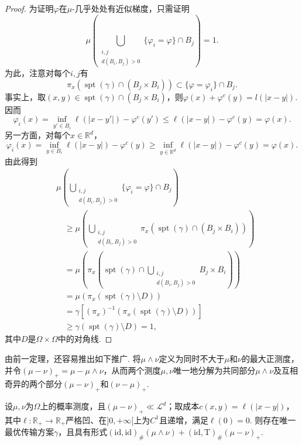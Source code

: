 \begin{proof}
为证明$\varphi$在$\mu$-几乎处处有近似梯度，只需证明
\[
\mu\left(\bigcup_{\substack{i,j\\d(B_i,B_j)>0}}\{\varphi_i=\varphi\}\cap B_j\right)=1.
\]
为此，注意对每个$i,j$有
\[
\pi_x(\operatorname{spt}(\gamma)\cap(B_j\times B_i))\subset\{\varphi=\varphi_i\}\cap B_j.
\]
事实上，取$(x,y)\in\operatorname{spt}(\gamma)\cap(B_j\times B_i)$，则$\varphi(x)+\varphi^c(y)=l(|x-y|)$. 因而
\[
\varphi_i(x)=\inf_{y'\in B_i}\ell(|x-y'|)-\varphi^c(y')
\le\ell(|x-y|)-\varphi^c(y)=\varphi(x).
\]
另一方面，对每个$x\in\mathbb R^d$，
\[
\varphi_i(x)=\inf_{y\in B_i}\ell(|x-y|)-\varphi^c(y)
\ge\inf_{y\in\mathbb R^d}\ell(|x-y|)-\varphi^c(y)=\varphi(x).
\]
由此得到
\begin{equation*}
\begin{aligned}
&\mu\left(\bigcup_{\substack{i,j\\d(B_i,B_j)>0}}\{\varphi_i=\varphi\}\cap B_j\right)\\
&\quad\ge\mu\left(\bigcup_{\substack{i,j\\d(B_i,B_j)>0}}\pi_x(\operatorname{spt}(\gamma)\cap(B_j\times B_i))\right)\\
&\quad=\mu\left(\pi_x\left(\operatorname{spt}(\gamma)\cap\bigcup_{\substack{i,j\\d(B_i,B_j)>0}}B_j\times B_i\right)\right)\\
&\quad=\mu(\pi_x(\operatorname{spt}(\gamma)\setminus D))\\
&\quad=\gamma\left[(\pi_x)^{-1}(\pi_x(\operatorname{spt}(\gamma)\setminus D))\right]\\
&\quad\ge\gamma(\operatorname{spt}(\gamma)\setminus D)=1,
\end{aligned}
\end{equation*}
其中$D$是$\Omega\times\Omega$中的对角线.
\end{proof}

由前一定理，还容易推出如下推广. 将$\mu\wedge\nu$定义为同时不大于$\mu$和$\nu$的最大正测度，并令$(\mu-\nu)_+=\mu-\mu\wedge\nu$，从而两个测度$\mu,\nu$唯一地分解为共同部分$\mu\wedge\nu$及互相奇异的两个部分$(\mu-\nu)_+$和$(\nu-\mu)_+$.

\begin{theorem}\label{obj:3.27}
设$\mu,\nu$为$\Omega$上的概率测度，且$(\mu-\nu)_+\ll\mathscr L^d$；取成本$c(x,y)=\ell(|x-y|)$，其中$\ell:\mathbb R_+\to\mathbb R_+$严格凹、在$]0,+\infty[$上为$C^1$且递增，满足$\ell(0)=0$. 则存在唯一最优传输方案$\gamma$，且具有形式$(\mathrm{id},\mathrm{id})_\#(\mu\wedge\nu)+(\mathrm{id},\mathrm T)_\#(\mu-\nu)_+$.
\end{theorem}

